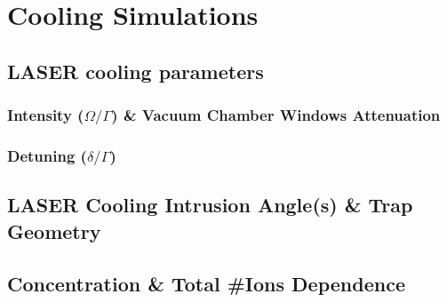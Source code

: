 \chapter{Cooling Simulations}

\section{LASER cooling parameters}

\subsection{Intensity (\(\Omega/\Gamma\)) \& Vacuum Chamber Windows Attenuation}

\subsection{Detuning (\(\delta/\Gamma\))}

\section{LASER Cooling Intrusion Angle(s) \& Trap Geometry}

\section{ Concentration \& Total \#Ions Dependence}

